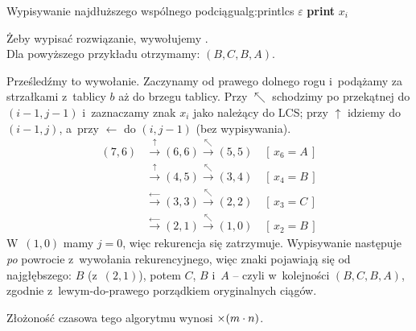 \begin{alg}{Wypisywanie najdłuższego wspólnego podciągu}{alg:printlcs}
	\State \Return $\varepsilon$ 
	\EndIf
	\State {}
	\State \textbf{print} $x_i$
	\State {}
	\Else
	\State {}
	\EndIf
	\EndFunction
\end{alg}

Żeby wypisać rozwiązanie, wywołujemy . \\
Dla powyższego przykładu otrzymamy: $(B, C, B, A)$.

\begin{dygresja}
	Prześledźmy to wywołanie. Zaczynamy od prawego dolnego rogu i~podążamy za
	strzałkami z~tablicy $b$ aż do brzegu tablicy. Przy $\nwarrow$ schodzimy po
	przekątnej do $(i - 1, j - 1)$ i~zaznaczamy znak $x_i$ jako należący do LCS;
	przy $\uparrow$ idziemy do $(i - 1, j)$, a~przy $\leftarrow$ do $(i, j - 1)$
	(bez wypisywania).
	\begin{align*}
		(7, 6) & \xrightarrow{\uparrow}     (6, 6)
		\xrightarrow{\nwarrow}      (5, 5) \quad[\,x_6 = A\,] \\
		       & \xrightarrow{\uparrow}      (4, 5)
		\xrightarrow{\nwarrow}      (3, 4) \quad[\,x_4 = B\,] \\
		       & \xrightarrow{\leftarrow}    (3, 3)
		\xrightarrow{\nwarrow}      (2, 2) \quad[\,x_3 = C\,] \\
		       & \xrightarrow{\leftarrow}    (2, 1)
		\xrightarrow{\nwarrow}      (1, 0) \quad[\,x_2 = B\,]
	\end{align*}
	W~$(1, 0)$ mamy $j = 0$, więc rekurencja się zatrzymuje. Wypisywanie następuje
	\emph{po} powrocie z~wywołania rekurencyjnego, więc znaki pojawiają się od
	najgłębszego: $B$ (z~$(2,1)$), potem $C$, $B$ i~$A$ -- czyli w~kolejności
	$(B, C, B, A)$, zgodnie z~lewym-do-prawego porządkiem oryginalnych ciągów.
\end{dygresja}

Złożoność czasowa tego algorytmu wynosi $\mathcal{\Theta}(m \cdot n)$.
